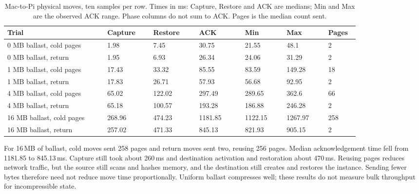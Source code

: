\begin{table}[htbp]
\centering\small
\caption{Mac-to-Pi physical moves, ten samples per row. Times in ms: Capture, Restore and ACK are medians; Min and Max are the observed ACK range. Phase columns do not sum to ACK. Pages is the median count sent.}
\label{tab:eval-live-move}
\setlength{\tabcolsep}{3pt}
\begin{tabular}{p{0.24\linewidth}p{0.11\linewidth}p{0.11\linewidth}p{0.11\linewidth}p{0.1\linewidth}p{0.1\linewidth}p{0.07\linewidth}}
\toprule
Trial & Capture & Restore & ACK & Min & Max & Pages \\
\midrule
0 MB ballast, cold pages & 1.98 & 7.45 & 30.75 & 21.55 & 48.1 & 2 \\
0 MB ballast, return & 1.95 & 6.93 & 26.34 & 24.06 & 31.29 & 2 \\
1 MB ballast, cold pages & 17.43 & 33.32 & 85.55 & 83.59 & 149.28 & 18 \\
1 MB ballast, return & 17.83 & 26.71 & 57.93 & 56.68 & 92.95 & 2 \\
4 MB ballast, cold pages & 65.02 & 122.02 & 297.49 & 289.65 & 362.6 & 66 \\
4 MB ballast, return & 65.18 & 100.57 & 193.28 & 186.88 & 246.28 & 2 \\
16 MB ballast, cold pages & 268.96 & 474.23 & 1181.85 & 1122.15 & 1267.97 & 258 \\
16 MB ballast, return & 257.02 & 471.33 & 845.13 & 821.93 & 905.15 & 2 \\
\bottomrule
\end{tabular}
\end{table}

For 16\,MB of ballast, cold moves sent 258 pages and return moves sent
two, reusing 256 pages. Median acknowledgement time fell from 1181.85 to
845.13\,ms. Capture still took about 260\,ms and destination activation
and restoration about 470\,ms. Reusing pages reduces network traffic,
but the source still scans and hashes memory, and the destination still
creates and restores the instance. Sending fewer bytes therefore need
not reduce move time proportionally. Uniform ballast compresses well;
these results do not measure bulk throughput for incompressible state.

